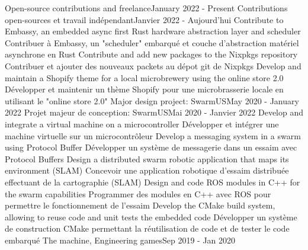     \resumeSubHeadingListStart
        \resumeProjectHeadingEnFr
              {Open-source contributions and freelance}{January 2022 - Present}
              {Contributions open-sources et travail indépendant}{Janvier 2022 - Aujourd’hui}
                \resumeItemListStart
                    \resumeItemEnFr
                        {Contribute to Embassy, an embedded async first Rust hardware abstraction layer and scheduler}
                        {Contribuer à Embassy, un "scheduler" embarqué et couche d'abstraction matériel asynchrone en Rust}
                    \resumeItemEnFr
                        {Contribute and add new packages to the Nixpkgs repository}
                        {Contribuer et ajouter des nouveaux packets au dépot git de Nixpkgs}
                    \resumeItemEnFr
                        {Develop and maintain a Shopify theme for a local microbrewery using the online store 2.0}
                        {Développer et maintenir un thème Shopify pour une microbrasserie locale en utilisant le "online store 2.0"}
                \resumeItemListEnd
      \resumeProjectHeadingEnFr
          {Major design project: SwarmUS}{May 2020 - January 2022}
          {Projet majeur de conception: SwarmUS}{Mai 2020 - Janvier 2022}
            \resumeItemListStart
                \resumeItemEnFr
                    {Develop and integrate a virtual machine on a microcontroller}
                    {Développer et intégrer une machine virtuelle sur un microcontrôleur}
                \resumeItemEnFr
                    {Develop a messaging system in a swarm using Protocol Buffer}
                    {Développer un système de messagerie dans un essaim avec Protocol Buffers}
                \resumeItemEnFr
                    {Design a distributed swarm robotic application that maps its environment (SLAM)}
                    {Concevoir une application robotique d’essaim distribuée effectuant de la cartographie (SLAM)}
                \resumeItemEnFr
                    {Design and code ROS modules in C++ for the swarm capabilities}
                    {Programmer des modules en C++ avec ROS pour permettre le fonctionnement de l’essaim}
                \resumeItemEnFr
                    {Develop the CMake build system, allowing to reuse code and unit tests the embedded code}
                    {Développer un système de construction CMake permettant la réutilisation de code et de tester le code embarqué}
            \resumeItemListEnd
      \resumeProjectHeadingEnFr
          {The machine, Engineering games}{Sep 2019 - Jan 2020}

